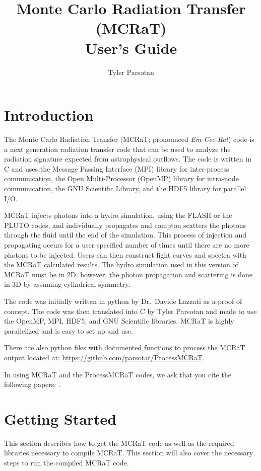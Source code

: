 \documentclass[12pt,a4paper]{article}
\title{Monte Carlo Radiation Transfer (MCRaT)\\User's Guide}
\author{Tyler Parsotan}
\date{}
\begin{document}
\maketitle

\tableofcontents
\newpage

\section{Introduction}
The Monte Carlo Radiation Transfer (MCRaT; pronounced \textit{Em-Cee-Rat}) code is a next generation radiation transfer code that can be used to analyze the radiation signature expected from astrophysical outflows. The code is written in C and uses the Message Passing Interface (MPI) library for inter-process communication, the Open Multi-Processor (OpenMP) library for intra-node communication, the GNU Scientific Library, and the HDF5 library for parallel I/O.

MCRaT injects photons into a hydro simulation, using the FLASH or the PLUTO codes, and individually propagates and compton scatters the photons through the fluid until the end of the simulation. This process of injection and propagating occurs for a user specified number of times until there are no more photons to be injected. Users can then construct light curves and spectra with the MCRaT calculated results. The hydro simulation used in this version of MCRaT must be in 2D, however, the photon propagation and scattering is done in 3D by assuming cylindrical symmetry.

The code was initially written in python by Dr.\ Davide Lazzati as a proof of concept. The code was then translated into C by Tyler Parsotan and made to use the OpenMP, MPI, HDF5, and GNU Scientific libraries. MCRaT is highly parallelized and is easy to set up and use.

There are also python files with documented functions to process the MCRaT output located at: \url{https://github.com/parsotat/ProcessMCRaT}.

In using MCRaT and the ProcessMCRaT codes, we ask that you cite the following papers: \cite{MCRaT, parsotan_mcrat, parsotan_var}.

\section{Getting Started}
This section describes how to get the MCRaT code as well as the required libraries necessary to compile MCRaT. This section will also cover the necessary steps to run the compiled MCRaT code. 
\end{document}
